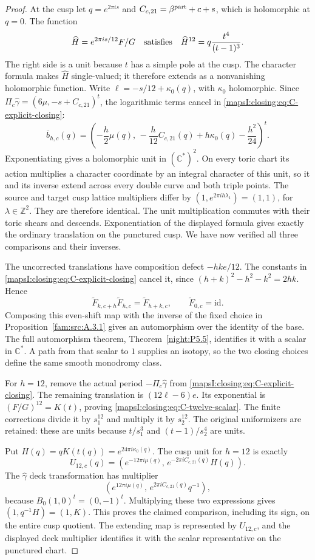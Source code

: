 \begin{proof}
At the cusp let \(q=e^{2\pi i s}\) and
\(C_{c,21}=\beta^{\rm part}+c+s\), which is holomorphic at
\(q=0\). The function
\[
 \widehat H=e^{2\pi i s/12}F/G
 \quad\hbox{satisfies}\quad
 \widehat H^{12}=q\frac{t^4}{(t-1)^3}.
\]
The right side is a unit because \(t\) has a simple pole at the
cusp. The character formula makes \(\widehat H\) single-valued;
it therefore extends as a nonvanishing holomorphic function. Write
\(\ell=-s/12+\kappa_0(q)\), with \(\kappa_0\) holomorphic.
Since
\(\Pi_c\widehat\gamma=(6\mu,-s+C_{c,21})^t\),
the logarithmic terms cancel in \eqref{mapsI:closing:eq:C-explicit-closing}:
\[
 \bar b_{h,c}(q)=
 \left(-\frac h2\mu(q),\,
 -\frac h{12}C_{c,21}(q)+h\kappa_0(q)-\frac{h^2}{24}\right)^t.
\]
Exponentiating gives a holomorphic unit in \((\mathbb C^*)^2\).
On every toric chart its action multiplies a character coordinate
by an integral character of this unit, so it and its inverse
extend across every double curve and both triple points. The
source and target cusp lattice multipliers differ by
\((1,e^{2\pi i h\lambda_1})=(1,1)\), for
\(\lambda\in\mathbb Z^2\). They are therefore identical. The
unit multiplication commutes with their toric shears and descends.
Exponentiation of the displayed formula gives exactly the ordinary
translation on the punctured cusp. We have now verified all
three comparisons and their inverses.

The uncorrected translations have composition defect
\(-hk e/12\). The constants in
\eqref{mapsI:closing:eq:C-explicit-closing} cancel it, since
\((h+k)^2-h^2-k^2=2hk\). Hence
\[
 \widetilde F_{k,c+h}\widetilde F_{h,c}
       =\widetilde F_{h+k,c},\qquad
 \widetilde F_{0,c}=\mathrm{id}.
\]
Composing this even-shift map with the inverse of the fixed choice in Proposition~\ref{fam:src:A.3.1} gives an automorphism over the identity of the base. The full automorphism theorem, Theorem~\ref{night:P5.5}, identifies it with a scalar in $\mathbb C^*$. A path from that scalar to $1$ supplies an isotopy, so the two closing choices define the same smooth monodromy class.

For \(h=12\), remove the actual period
\(-\Pi_c\widehat\gamma\) from \eqref{mapsI:closing:eq:C-explicit-closing}.
The remaining translation is \((12\ell-6)e\). Its exponential
is \((F/G)^{12}=K(t)\), proving
\eqref{mapsI:closing:eq:C-twelve-scalar}. The finite corrections divide it by
\(s_1^{12}\) and multiply it by \(s_2^{12}\). The original
uniformizers are retained: these are units because
\(t/s_1^3\) and \((t-1)/s_2^4\) are units. 

Put \(H(q)=qK(t(q))=e^{24\pi i\kappa_0(q)}\). The cusp unit
for \(h=12\) is exactly
\[
 U_{12,c}(q)=
 \left(e^{-12\pi i\mu(q)},\,
       e^{-2\pi i C_{c,21}(q)}H(q)\right).
\]
The \(\widehat\gamma\) deck transformation has multiplier
\[
 \left(e^{12\pi i\mu(q)},\,
       e^{2\pi i C_{c,21}(q)}q^{-1}\right),
\]
because \(B_0(1,0)^t=(0,-1)^t\). Multiplying these two
expressions gives \((1,q^{-1}H)=(1,K)\). This proves the
claimed comparison, including its sign, on the entire cusp
quotient. The extending map is represented by $U_{12,c}$, and the displayed deck multiplier identifies it with the scalar representative on the punctured chart.


\end{proof}
